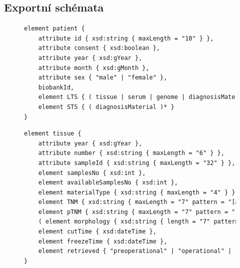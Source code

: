 \documentclass[11pt, draft, oneside]{fithesis2}
\begin{document}
\begin{appendix}

\chapter{Exportní schémata}

\begin{figure}[ht!]
\begin{center}
\begin{lstlisting}[language=XML, caption={Element popisující pacienta v~exportním schématu.}, label={fig:export:data:patient}]
element patient {		
	attribute id { xsd:string { maxLength = "10" } },		
	attribute consent { xsd:boolean },   
	attribute year { xsd:gYear },	  
	attribute month { xsd:gMonth },   
	attribute sex { "male" | "female" },	  
	biobankId,		
	element LTS { ( tissue | serum | genome | diagnosisMaterial )* },		
	element STS { ( diagnosisMaterial )* }
}

\end{lstlisting}
\end{center}
\end{figure}

\begin{figure}[ht!]
\begin{center}
\begin{lstlisting}[language=XML, caption={Element popisující tkáň v~exportním schématu.},
label={fig:export:data:tissue}]
element tissue {
	attribute year { xsd:gYear },
	attribute number { xsd:string { maxLength = "6" } },
	attribute sampleId { xsd:string { maxLength = "32" } },
	element samplesNo { xsd:int },
	element availableSamplesNo { xsd:int },
	element materialType { xsd:string { maxLength = "4" } },
	element TNM { xsd:string { maxLength = "7" pattern = "[a-zA-Z0-9]+" } },
	element pTNM { xsd:string { maxLength = "7" pattern = "[a-zA-Z0-9]+" } },
	( element morphology { xsd:string { length = "7" pattern = "[0-9]{4}/[0-9]{2}"} } | element grading { xsd:int { minInclusive = "1" maxInclusive = "9" } } ),
	element cutTime { xsd:dateTime },
	element freezeTime { xsd:dateTime },
	element retrieved { "preoperational" | "operational" | "post" | "unknown" }
}
\end{lstlisting}
\end{center}
\end{figure}


\end{appendix}
\end{document}
